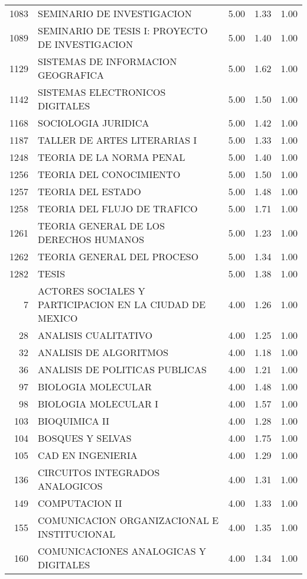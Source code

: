 \documentclass[12pt]{article}
\begin{document}
\begin{table}[ht]
\begin{tabular}{rlrrr}
  1083 & SEMINARIO DE INVESTIGACION & 5.00 & 1.33 & 1.00 \\ 
  1089 & SEMINARIO DE TESIS I: PROYECTO DE INVESTIGACION & 5.00 & 1.40 & 1.00 \\ 
  1129 & SISTEMAS DE INFORMACION GEOGRAFICA & 5.00 & 1.62 & 1.00 \\ 
  1142 & SISTEMAS ELECTRONICOS DIGITALES & 5.00 & 1.50 & 1.00 \\ 
  1168 & SOCIOLOGIA JURIDICA & 5.00 & 1.42 & 1.00 \\ 
  1187 & TALLER DE ARTES LITERARIAS I & 5.00 & 1.33 & 1.00 \\ 
  1248 & TEORIA DE LA NORMA PENAL & 5.00 & 1.40 & 1.00 \\ 
  1256 & TEORIA DEL CONOCIMIENTO & 5.00 & 1.50 & 1.00 \\ 
  1257 & TEORIA DEL ESTADO & 5.00 & 1.48 & 1.00 \\ 
  1258 & TEORIA DEL FLUJO DE TRAFICO & 5.00 & 1.71 & 1.00 \\ 
  1261 & TEORIA GENERAL DE LOS DERECHOS HUMANOS & 5.00 & 1.23 & 1.00 \\ 
  1262 & TEORIA GENERAL DEL PROCESO & 5.00 & 1.34 & 1.00 \\ 
  1282 & TESIS & 5.00 & 1.38 & 1.00 \\ 
  7 & ACTORES SOCIALES Y PARTICIPACION EN LA CIUDAD DE MEXICO & 4.00 & 1.26 & 1.00 \\ 
  28 & ANALISIS CUALITATIVO & 4.00 & 1.25 & 1.00 \\ 
  32 & ANALISIS DE ALGORITMOS & 4.00 & 1.18 & 1.00 \\ 
  36 & ANALISIS DE POLITICAS PUBLICAS & 4.00 & 1.21 & 1.00 \\ 
  97 & BIOLOGIA MOLECULAR & 4.00 & 1.48 & 1.00 \\ 
  98 & BIOLOGIA MOLECULAR I & 4.00 & 1.57 & 1.00 \\ 
  103 & BIOQUIMICA II & 4.00 & 1.28 & 1.00 \\ 
  104 & BOSQUES Y SELVAS & 4.00 & 1.75 & 1.00 \\ 
  105 & CAD EN INGENIERIA & 4.00 & 1.29 & 1.00 \\ 
  136 & CIRCUITOS INTEGRADOS ANALOGICOS & 4.00 & 1.31 & 1.00 \\ 
  149 & COMPUTACION II & 4.00 & 1.33 & 1.00 \\ 
  155 & COMUNICACION ORGANIZACIONAL E INSTITUCIONAL & 4.00 & 1.35 & 1.00 \\ 
  160 & COMUNICACIONES ANALOGICAS Y DIGITALES & 4.00 & 1.34 & 1.00 \\ 

\end{tabular}
\end{table}
\end{document}
